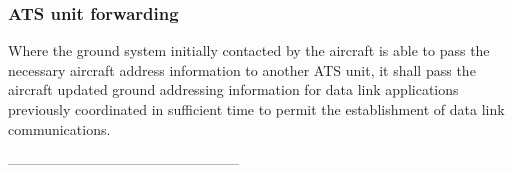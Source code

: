 \documentclass[../main.tex]{subfiles}
\begin{document}
    \subsubsection{ATS unit forwarding}

    Where the ground system initially contacted by the aircraft is able to pass the necessary aircraft address information to another ATS unit, it shall pass the aircraft updated ground addressing information for data link applications previously coordinated in sufficient time to permit the establishment of data link communications.


    \begin{center}
        \vspace{1cm}
        --------------------------------------------------
        \newpage
    \end{center}
\end{document}
